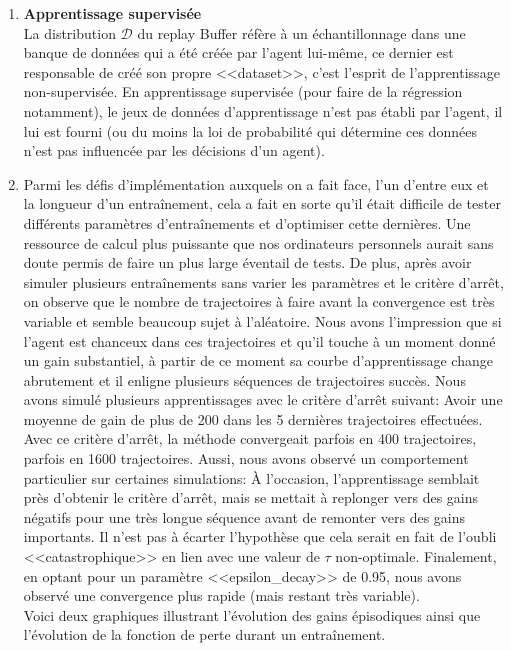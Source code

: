 \documentclass[letterpaper,11pt]{article}
\begin{document}
\begin{enumerate}[label=(\alph*)]
\item \textbf{Apprentissage supervisée}\\
La distribution $\mathcal{D}$ du replay Buffer réfère à un échantillonnage dans une banque de données qui a été créée par l'agent lui-même, ce dernier est responsable de créé son propre <<dataset>>, c'est l'esprit de l'apprentissage non-supervisée. En apprentissage supervisée (pour faire de la régression notamment), le jeux de données d'apprentissage n'est pas établi par l'agent, il lui est fourni (ou du moins la loi de probabilité qui détermine ces données n'est pas influencée par les décisions d'un agent).

\item Parmi les défis d'implémentation auxquels on a fait face, l'un d'entre eux et la longueur d'un entraînement, cela a fait en sorte qu'il était difficile de tester différents paramètres d'entraînements et d'optimiser cette dernières. Une ressource de calcul plus puissante que nos ordinateurs personnels aurait sans doute permis de faire un plus large éventail de tests. De plus, après avoir simuler plusieurs entraînements sans varier les paramètres et le critère d'arrêt, on observe que le nombre de trajectoires à faire avant la convergence est très variable et semble beaucoup sujet à l'aléatoire. Nous avons l'impression que si l'agent est chanceux dans ces trajectoires et qu'il touche à un moment donné un gain substantiel, à partir de ce moment sa courbe d'apprentissage change abrutement et il enligne plusieurs séquences de trajectoires succès. Nous avons simulé plusieurs apprentissages avec le critère d'arrêt suivant: Avoir une moyenne de gain de plus de 200 dans les 5 dernières trajectoires effectuées. Avec ce critère d'arrêt, la méthode convergeait parfois en 400 trajectoires, parfois en 1600 trajectoires. Aussi, nous avons observé un comportement particulier sur certaines simulations: À l'occasion, l'apprentissage semblait près d'obtenir le critère d'arrêt, mais se mettait à replonger vers des gains négatifs pour une très longue séquence avant de remonter vers des gains importants. Il n'est pas à écarter l'hypothèse que cela serait en fait de l'oubli <<catastrophique>> en lien avec une valeur de $\tau$ non-optimale. Finalement, en optant pour un paramètre <<epsilon\_decay>> de 0.95, nous avons observé une convergence plus rapide (mais restant très variable).\\

Voici deux graphiques illustrant l'évolution des gains épisodiques ainsi que l'évolution de la fonction de perte durant un entraînement.


\end{enumerate}
\end{document}
